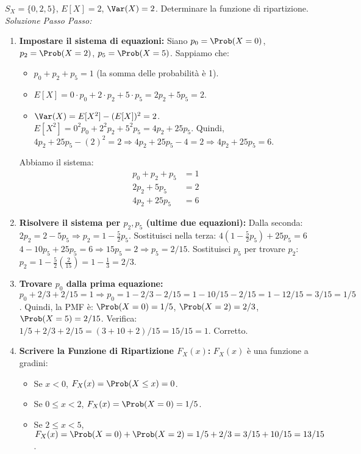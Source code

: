 \begin{example}
$S_X = \{0, 2, 5\}$, $E[X]=2$, $\Var(X)=2$. Determinare la funzione di ripartizione.
\textit{Soluzione Passo Passo:}
\begin{enumerate}
    \item \textbf{Impostare il sistema di equazioni:}
    Siano $p_0 = \Prob(X=0)$, $p_2 = \Prob(X=2)$, $p_5 = \Prob(X=5)$.
    Sappiamo che:
    \begin{itemize}
        \item $p_0 + p_2 + p_5 = 1$ (la somma delle probabilità è 1).
        \item $E[X] = 0 \cdot p_0 + 2 \cdot p_2 + 5 \cdot p_5 = 2p_2 + 5p_5 = 2$.
        \item $\Var(X) = E[X^2] - (E[X])^2 = 2$.
          $E[X^2] = 0^2 p_0 + 2^2 p_2 + 5^2 p_5 = 4p_2 + 25p_5$.
          Quindi, $4p_2 + 25p_5 - (2)^2 = 2 \Rightarrow 4p_2 + 25p_5 - 4 = 2 \Rightarrow 4p_2 + 25p_5 = 6$.
    \end{itemize}
    Abbiamo il sistema:
    \begin{align*}
        p_0 + p_2 + p_5 &= 1 \\
        2p_2 + 5p_5 &= 2 \\
        4p_2 + 25p_5 &= 6
    \end{align*}
    \item \textbf{Risolvere il sistema per $p_2, p_5$ (ultime due equazioni):}
    Dalla seconda: $2p_2 = 2 - 5p_5 \Rightarrow p_2 = 1 - \frac{5}{2}p_5$.
    Sostituisci nella terza: $4(1 - \frac{5}{2}p_5) + 25p_5 = 6$
    $4 - 10p_5 + 25p_5 = 6 \Rightarrow 15p_5 = 2 \Rightarrow p_5 = 2/15$.
    Sostituisci $p_5$ per trovare $p_2$: $p_2 = 1 - \frac{5}{2}(\frac{2}{15}) = 1 - \frac{1}{3} = 2/3$.
    \item \textbf{Trovare $p_0$ dalla prima equazione:}
    $p_0 + 2/3 + 2/15 = 1 \Rightarrow p_0 = 1 - 2/3 - 2/15 = 1 - 10/15 - 2/15 = 1 - 12/15 = 3/15 = 1/5$.
    Quindi, la PMF è: $\Prob(X=0)=1/5$, $\Prob(X=2)=2/3$, $\Prob(X=5)=2/15$.
    Verifica: $1/5 + 2/3 + 2/15 = (3+10+2)/15 = 15/15=1$. Corretto.
    \item \textbf{Scrivere la Funzione di Ripartizione $F_X(x)$:}
    $F_X(x)$ è una funzione a gradini:
    \begin{itemize}
        \item Se $x < 0$, $F_X(x) = \Prob(X \le x) = 0$.
        \item Se $0 \le x < 2$, $F_X(x) = \Prob(X=0) = 1/5$.
        \item Se $2 \le x < 5$, $F_X(x) = \Prob(X=0) + \Prob(X=2) = 1/5 + 2/3 = 3/15 + 10/15 = 13/15$.

\end{itemize}
\end{enumerate}
\end{example}
